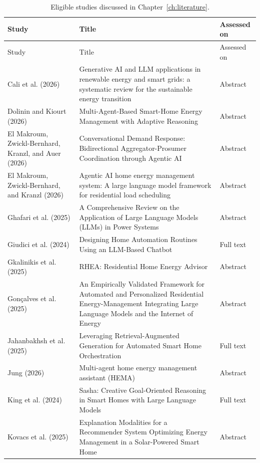 \documentclass[12pt,a4paper]{report}
\begin{document}
{\small{}
\begin{longtable}{>{\raggedright\arraybackslash}p{}>{\raggedright\arraybackslash}p{}>{\raggedright\arraybackslash}p{}}
\caption{Eligible studies discussed in Chapter~\ref{ch:literature}.}
\label{tab:studies-discussed}\\
\toprule
Study & Title & Assessed on \\
\midrule
\endfirsthead
\toprule
Study & Title & Assessed on \\
\midrule
\endhead
\bottomrule
\endfoot
Cali et al. (2026) & Generative AI and LLM applications in renewable energy and smart grids: a systematic review for the sustainable energy transition & Abstract \\[3pt]
Dolinin and Kiourt (2026) & Multi-Agent-Based Smart-Home Energy Management with Adaptive Reasoning & Abstract \\[3pt]
El Makroum, Zwickl-Bernhard, Kranzl, and Auer (2026) & Conversational Demand Response: Bidirectional Aggregator-Prosumer Coordination through Agentic AI & Abstract \\[3pt]
El Makroum, Zwickl-Bernhard, and Kranzl (2026) & Agentic AI home energy management system: A large language model framework for residential load scheduling & Abstract \\[3pt]
Ghafari et al. (2025) & A Comprehensive Review on the Application of Large Language Models (LLMs) in Power Systems & Abstract \\[3pt]
Giudici et al. (2024) & Designing Home Automation Routines Using an LLM-Based Chatbot & Full text \\[3pt]
Gkalinikis et al. (2025) & RHEA: Residential Home Energy Advisor & Abstract \\[3pt]
Gonçalves et al. (2025) & An Empirically Validated Framework for Automated and Personalized Residential Energy-Management Integrating Large Language Models and the Internet of Energy & Abstract \\[3pt]
Jahanbakhsh et al. (2025) & Leveraging Retrieval-Augmented Generation for Automated Smart Home Orchestration & Full text \\[3pt]
Jung (2026) & Multi-agent home energy management assistant (HEMA) & Abstract \\[3pt]
King et al. (2024) & Sasha: Creative Goal-Oriented Reasoning in Smart Homes with Large Language Models & Full text \\[3pt]
Kovacs et al. (2025) & Explanation Modalities for a Recommender System Optimizing Energy Management in a Solar-Powered Smart Home & Abstract \\[3pt]

\end{longtable}}
\end{document}
